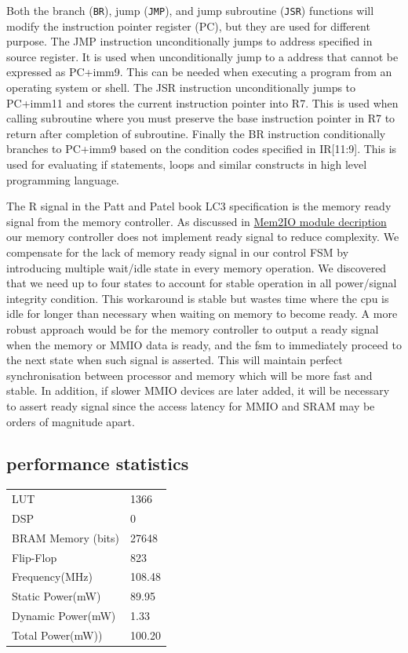 \documentclass[a4paper,12pt]{report}
\begin{document}
Both the branch (\verb*|BR|), jump (\verb*|JMP|), and jump subroutine (\verb*|JSR|) functions will modify the instruction pointer register (PC), but they are used for different purpose. \newline 
The JMP instruction unconditionally jumps to address specified in source register. It is used when unconditionally jump to a address that cannot be expressed as PC+imm9. This can be needed when executing a program from an operating system or shell. \newline 
The JSR instruction unconditionally jumps to PC+imm11 and stores the current instruction pointer into R7. This is used when calling subroutine where you must preserve the base instruction pointer in R7 to return after completion of subroutine.\newline
Finally the BR instruction conditionally branches to PC+imm9 based on the condition codes specified in IR[11:9]. This is used for evaluating if statements, loops and similar constructs in high level programming language. \newline

The R signal in the Patt and Patel book LC3 specification is the memory ready signal from the memory controller. As discussed in \hyperref[sec: memcontroller]{Mem2IO module decription} our memory controller does not implement ready signal to reduce complexity. We compensate for the lack of memory ready signal in our control FSM by introducing multiple wait/idle state in every memory operation. We discovered that we need up to four states to account for stable operation in all power/signal integrity condition. This workaround is stable but wastes time where the cpu is idle for longer than necessary when waiting on memory to become ready. A more robust approach would be for the memory controller to output a ready signal when the memory or MMIO data is ready, and the fsm to immediately proceed to the next state when such signal is asserted. This will maintain perfect synchronisation between processor and memory which will be more fast and stable. In addition, if slower MMIO devices are later added, it will be necessary to assert ready signal since the access latency for MMIO and SRAM may be orders of magnitude apart. \newline
\subsection{performance statistics}
\begin{tabular}{ l l }
LUT & 1366\\  
DSP & 0\\  
BRAM Memory (bits) & 27648\\
Flip-Flop & 823\\  
Frequency(MHz) & 108.48\\ 
Static Power(mW) & 89.95\\  
Dynamic Power(mW) & 1.33\\  
Total Power(mW)) & 100.20 
\end{tabular} 
\end{document}

